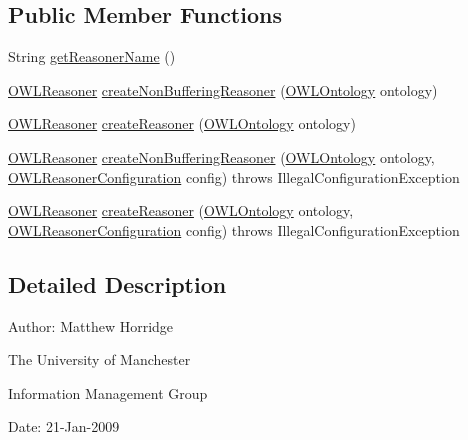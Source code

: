 \subsection*{Public Member Functions}
\begin{DoxyCompactItemize}
\item 
String \hyperlink{interfaceorg_1_1semanticweb_1_1owlapi_1_1reasoner_1_1_o_w_l_reasoner_factory_a4b84ad313506d9feeef49ace704bc4df}{get\-Reasoner\-Name} ()
\item 
\hyperlink{interfaceorg_1_1semanticweb_1_1owlapi_1_1reasoner_1_1_o_w_l_reasoner}{O\-W\-L\-Reasoner} \hyperlink{interfaceorg_1_1semanticweb_1_1owlapi_1_1reasoner_1_1_o_w_l_reasoner_factory_a2b119c65105b4b219b8d7920a17a0f7b}{create\-Non\-Buffering\-Reasoner} (\hyperlink{interfaceorg_1_1semanticweb_1_1owlapi_1_1model_1_1_o_w_l_ontology}{O\-W\-L\-Ontology} ontology)
\item 
\hyperlink{interfaceorg_1_1semanticweb_1_1owlapi_1_1reasoner_1_1_o_w_l_reasoner}{O\-W\-L\-Reasoner} \hyperlink{interfaceorg_1_1semanticweb_1_1owlapi_1_1reasoner_1_1_o_w_l_reasoner_factory_a48bc5b1f96b78f756f84b3f1f7d58a66}{create\-Reasoner} (\hyperlink{interfaceorg_1_1semanticweb_1_1owlapi_1_1model_1_1_o_w_l_ontology}{O\-W\-L\-Ontology} ontology)
\item 
\hyperlink{interfaceorg_1_1semanticweb_1_1owlapi_1_1reasoner_1_1_o_w_l_reasoner}{O\-W\-L\-Reasoner} \hyperlink{interfaceorg_1_1semanticweb_1_1owlapi_1_1reasoner_1_1_o_w_l_reasoner_factory_aa74a06753d0f56db29d01ea28b03497e}{create\-Non\-Buffering\-Reasoner} (\hyperlink{interfaceorg_1_1semanticweb_1_1owlapi_1_1model_1_1_o_w_l_ontology}{O\-W\-L\-Ontology} ontology, \hyperlink{interfaceorg_1_1semanticweb_1_1owlapi_1_1reasoner_1_1_o_w_l_reasoner_configuration}{O\-W\-L\-Reasoner\-Configuration} config)  throws Illegal\-Configuration\-Exception
\item 
\hyperlink{interfaceorg_1_1semanticweb_1_1owlapi_1_1reasoner_1_1_o_w_l_reasoner}{O\-W\-L\-Reasoner} \hyperlink{interfaceorg_1_1semanticweb_1_1owlapi_1_1reasoner_1_1_o_w_l_reasoner_factory_aa2b67bfa8d6f7c28f44d21126188d939}{create\-Reasoner} (\hyperlink{interfaceorg_1_1semanticweb_1_1owlapi_1_1model_1_1_o_w_l_ontology}{O\-W\-L\-Ontology} ontology, \hyperlink{interfaceorg_1_1semanticweb_1_1owlapi_1_1reasoner_1_1_o_w_l_reasoner_configuration}{O\-W\-L\-Reasoner\-Configuration} config)  throws Illegal\-Configuration\-Exception
\end{DoxyCompactItemize}


\subsection{Detailed Description}
Author\-: Matthew Horridge\par
 The University of Manchester\par
 Information Management Group\par
 Date\-: 21-\/\-Jan-\/2009 


